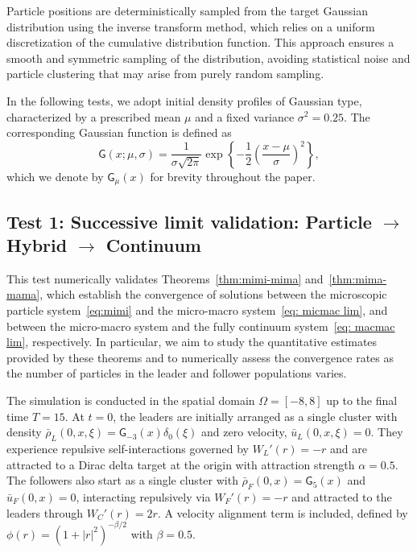 \documentclass[10pt, reqno]{amsart}
\theoremstyle{definition}
\theoremstyle{remark}
\numberwithin{equation}{section}
\begin{document}
Particle positions are deterministically sampled from the target Gaussian distribution using the inverse transform method, which relies on a uniform discretization of the cumulative distribution function. This approach ensures a smooth and symmetric sampling of the distribution, avoiding statistical noise and particle clustering that may arise from purely random sampling.

In the following tests, we adopt initial density profiles of Gaussian type, characterized by a prescribed mean $\mu$ and a fixed variance $\sigma^2 = 0.25$. The corresponding Gaussian function is defined as
\begin{equation*}%
    \mathsf{G}(x;\mu,\sigma) = \frac{1}{\sigma\sqrt{2\pi}} \exp\left\{ -\frac{1}{2} \left( \frac{x - \mu}{\sigma} \right)^2 \right\},
\end{equation*} which we denote by $\mathsf{G}_\mu(x)$ for brevity throughout the paper.








\subsection{Test 1: Successive limit validation: Particle $\to$ Hybrid $\to$ Continuum}
This test numerically validates Theorems~\ref{thm:mimi-mima} and~\ref{thm:mima-mama}, which establish the convergence of solutions between the microscopic particle system~\eqref{eq:mimi} and the micro-macro system~\eqref{eq: micmac lim}, and between the micro-macro system and the fully continuum system~\eqref{eq: macmac lim}, respectively. In particular, we aim to study the quantitative estimates provided by these theorems and to numerically assess the convergence rates as the number of particles in the leader and follower populations varies.

The simulation is conducted in the spatial domain $\Omega=[-8,8]$ up to the final time $T = 15$. At $t = 0$, the leaders are initially arranged as a single cluster with density $\bar \rho_L(0,x,\xi) = \mathsf{G}_{-3}(x)\delta_0(\xi)$ and zero velocity, $\bar u_L(0,x,\xi) = 0$. They experience repulsive self-interactions governed by $W_L'(r) = -r$ and are attracted to a Dirac delta target at the origin with attraction strength $\alpha = 0.5$. The followers also start as a single cluster with $\bar \rho_F(0,x) = \mathsf{G}_5(x)$ and $\bar u_F(0,x) = 0$, interacting repulsively via $W_F'(r) = -r$ and attracted to the leaders through $W_C'(r) = 2r$. A velocity alignment term is included, defined by $\phi(r) = (1 + |r|^2)^{-\beta/2}$ with $\beta = 0.5$.
\end{document}
